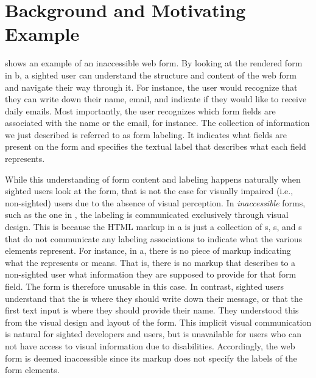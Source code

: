 
\section{Background and Motivating Example} \label{sec:motivation}
 shows an example of
an inaccessible web form. 
By looking at the rendered form in b,
a sighted user can understand 
the structure and content of the web form and navigate their way through it.
For instance, the user would recognize 
that they can write down their name, email, and indicate if they 
would like to receive daily emails. Most importantly, the user recognizes 
which form fields are associated with the name or the email, for instance. 
The collection of information we just described is referred to as form labeling. 
It indicates what fields are present on the form and specifies the textual 
label that describes what each field represents. 

While this understanding of form content and labeling happens naturally when 
sighted users look at the form, that is not the case for visually impaired 
(i.e., non-sighted) users due to the absence of visual perception. 
In \emph{inaccessible} forms, such as the one in , 
the labeling is communicated exclusively through visual design. 
This is because the HTML markup in a 
is just a collection of s, s, and s 
that do not communicate any labeling associations to indicate what the various 
elements represent. For instance, in a, there is no 
piece of markup indicating what the  represents or means. 
That is, there is no markup that describes to a non-sighted user 
what information they are supposed to provide for that form field. 
The form is therefore unusable in this case. 
In contrast, sighted users understand 
that the  is where they should write down their message, 
or that the first text input is where they should provide their name. 
They understood this from the visual design and layout 
of the form. This implicit visual communication is natural for sighted 
developers and users, but is unavailable for users who can 
not have access to visual information due to disabilities. 
Accordingly, the web form is deemed inaccessible since its markup does 
not specify the labels of the form elements. 


